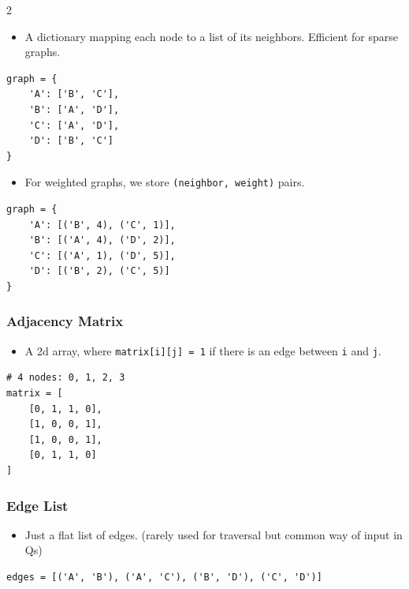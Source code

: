 \documentclass[9pt,a4paper]{extarticle}
\newlength{\tw}
\begin{document}
\begin{multicols}{2}
\begin{itemize}
\item A dictionary mapping each node to a list of  its neighbors. Efficient for sparse graphs.
\end{itemize}

\begin{lstlisting}
graph = {
    'A': ['B', 'C'],
    'B': ['A', 'D'],
    'C': ['A', 'D'],
    'D': ['B', 'C']
}
\end{lstlisting}

\begin{itemize}
\item For weighted graphs, we store \texttt{(\allowbreak{}neighbor,\allowbreak{} weight)} pairs.
\end{itemize}

\begin{lstlisting}
graph = {
    'A': [('B', 4), ('C', 1)],
    'B': [('A', 4), ('D', 2)],
    'C': [('A', 1), ('D', 5)],
    'D': [('B', 2), ('C', 5)]
}
\end{lstlisting}

\subsubsection{Adjacency Matrix}

\begin{itemize}
\item A 2d array, where \texttt{matrix[\allowbreak{}i][\allowbreak{}j] =\allowbreak{} 1} if there is an edge between \texttt{i} and \texttt{j}.
\end{itemize}

\begin{lstlisting}
# 4 nodes: 0, 1, 2, 3
matrix = [
    [0, 1, 1, 0],
    [1, 0, 0, 1],
    [1, 0, 0, 1],
    [0, 1, 1, 0]
]
\end{lstlisting}

\subsubsection{Edge List}

\begin{itemize}
\item Just a flat list of edges. (rarely used for traversal but common way of input in Qs)
\end{itemize}

\begin{lstlisting}
edges = [('A', 'B'), ('A', 'C'), ('B', 'D'), ('C', 'D')]
\end{lstlisting}


\end{multicols}
\end{document}
